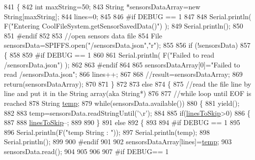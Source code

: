 \begin{DoxyCode}
841 \{
842     \textcolor{keywordtype}{int} maxString=50;
843     String *sensorsDataArray=\textcolor{keyword}{new} String[maxString];
844     lines=0;
845 
846 \textcolor{preprocessor}{#if DEBUG == 1 }
847 
848     Serial.println( F(\textcolor{stringliteral}{"Entering CoolFileSystem.getSensorSavedData()"}) );
849     Serial.println();
850 
851 \textcolor{preprocessor}{#endif}
852 
853     \textcolor{comment}{//open sensors data file}
854     File sensorsData=SPIFFS.open(\textcolor{stringliteral}{"/sensorsData.json"},\textcolor{stringliteral}{"r"});
855     
856     \textcolor{keywordflow}{if} (!sensorsData)
857     \{
858 
859 \textcolor{preprocessor}{    #if DEBUG == 1 }
860 
861         Serial.println( F(\textcolor{stringliteral}{"Failed to read /sensorsData.json"}) );
862 
863 \textcolor{preprocessor}{    #endif}
864          
865         sensorsDataArray[0]=\textcolor{stringliteral}{"Failed to read /sensorsData.json"};
866         lines++;
867 
868         \textcolor{comment}{//result=sensorsDataArray;}
869         \textcolor{keywordflow}{return}(sensorsDataArray);
870 
871     \}
872 
873     \textcolor{keywordflow}{else}
874     \{
875         \textcolor{comment}{//read the file line by line and put it in the String array(aka String*)        }
876 
877         \textcolor{comment}{//while loop until EOF is reached}
878         String \hyperlink{_irene3000_8h_a5905d48604152cf57aa6bfa087b49173}{temp};
879         \textcolor{keywordflow}{while}(sensorsData.available())
880         \{
881             yield();
882             
883             temp=sensorsData.readStringUntil(\textcolor{charliteral}{'\(\backslash\)r'});
884 
885             \textcolor{keywordflow}{if}(\hyperlink{class_cool_file_system_a84fdb6057e534b395512463daa28ea3c}{linesToSkip}>0)
886             \{
887 
888                 \hyperlink{class_cool_file_system_a84fdb6057e534b395512463daa28ea3c}{linesToSkip}--;
889         
890             \}
891             \textcolor{keywordflow}{else}
892             \{
893 
894 \textcolor{preprocessor}{            #if DEBUG == 1}
895 
896                 Serial.println(F(\textcolor{stringliteral}{"temp String : "}));
897                 Serial.println(temp);
898                 Serial.println();
899             
900 \textcolor{preprocessor}{            #endif}
901             
902                 sensorsDataArray[lines]=\hyperlink{_irene3000_8h_a5905d48604152cf57aa6bfa087b49173}{temp};
903                 sensorsData.read();
904             
905             
906         
907 \textcolor{preprocessor}{            #if DEBUG== 1}

\end{DoxyCode}
